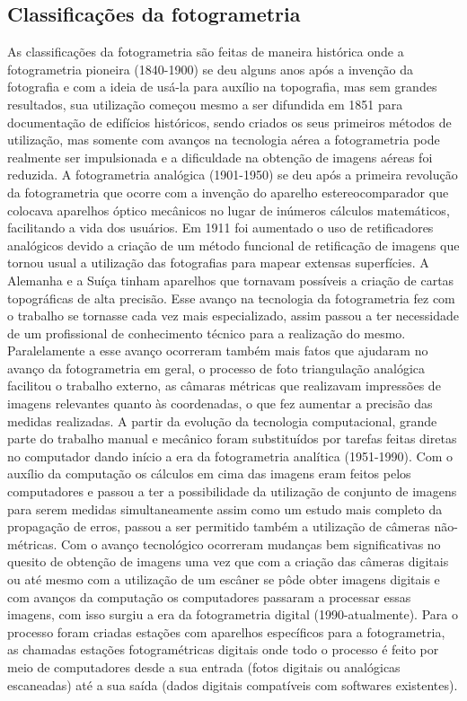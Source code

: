 \subsection{Classificações da fotogrametria}
As classificações da fotogrametria são feitas de maneira histórica onde a fotogrametria pioneira (1840-1900) se deu alguns anos após a invenção da fotografia e com a ideia de usá-la para auxílio na topografia, mas sem grandes resultados, sua utilização começou mesmo a ser difundida em 1851 para documentação de edifícios históricos, sendo criados os seus primeiros métodos de utilização, mas somente com avanços na tecnologia aérea a fotogrametria pode realmente ser impulsionada e a dificuldade na obtenção de imagens aéreas foi reduzida. 
A fotogrametria analógica (1901-1950) se deu após a primeira revolução da fotogrametria que ocorre com a invenção do aparelho estereocomparador que colocava aparelhos óptico mecânicos no lugar de inúmeros cálculos matemáticos, facilitando a vida dos usuários. Em 1911 foi aumentado o uso de retificadores analógicos devido a criação de um método funcional de retificação de imagens que tornou usual a utilização das fotografias para mapear extensas superfícies. A Alemanha e a Suíça tinham aparelhos que tornavam possíveis a criação de cartas topográficas de alta precisão. Esse avanço na tecnologia da fotogrametria fez com o trabalho se tornasse cada vez mais especializado, assim passou a ter necessidade de um profissional de conhecimento técnico para a realização do mesmo. Paralelamente a esse avanço ocorreram também mais fatos que ajudaram no avanço da fotogrametria em geral, o processo de foto triangulação analógica facilitou o trabalho externo, as câmaras métricas que realizavam impressões de imagens relevantes quanto às coordenadas, o que fez aumentar a precisão das medidas realizadas.
A partir da evolução da tecnologia computacional, grande parte do trabalho manual e mecânico foram substituídos por tarefas feitas diretas no computador dando início a era da fotogrametria analítica (1951-1990). Com o auxílio da computação os cálculos em cima das imagens eram feitos pelos computadores e passou a ter a possibilidade da utilização de conjunto de imagens para serem medidas simultaneamente assim como um estudo mais completo da propagação de erros, passou a ser permitido também a utilização de câmeras não-métricas.
Com o avanço tecnológico ocorreram mudanças bem significativas no quesito de obtenção de imagens uma vez que com a criação das câmeras digitais ou até mesmo com a utilização de um escâner se pôde obter imagens digitais e com avanços da computação os computadores passaram a processar essas imagens, com isso surgiu a era da fotogrametria digital (1990-atualmente). Para o processo foram criadas estações com aparelhos específicos para a fotogrametria, as chamadas estações fotogramétricas digitais onde todo o processo é feito por meio de computadores desde a sua entrada (fotos digitais ou analógicas escaneadas) até a sua saída (dados digitais compatíveis com softwares existentes).

